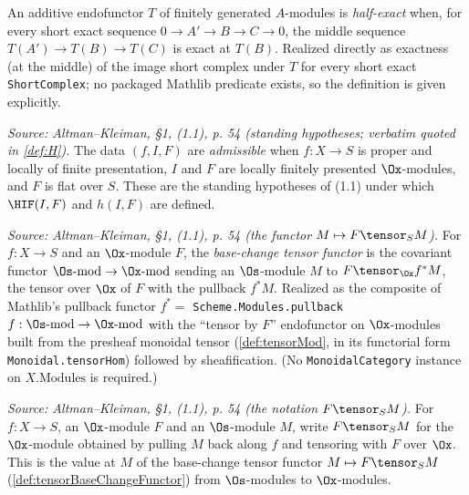 \begin{definition}
  \label{def:isHalfExact}
  An additive endofunctor $T$ of finitely generated $A$-modules is
  \emph{half-exact} when, for every short exact sequence
  $0 \to A' \to B \to C \to 0$, the middle sequence $T(A') \to T(B) \to T(C)$ is
  exact at $T(B)$. Realized directly as exactness (at the middle) of the image
  short complex under $T$ for every short exact \texttt{ShortComplex}; no packaged
  Mathlib predicate exists, so the definition is given explicitly.
\end{definition}

\begin{definition}
  \label{def:admissible}
  \textit{Source: Altman--Kleiman, §1, (1.1), p. 54 (standing hypotheses; verbatim quoted in \cref{def:H}).}
  The data $(f, I, F)$ are \emph{admissible} when $f : X \to S$ is proper and
  locally of finite presentation, $I$ and $F$ are locally finitely presented
  $\Ox$-modules, and $F$ is flat over $S$. These are the standing hypotheses of
  (1.1) under which $\HIF(I,F)$ and $h(I,F)$ are defined.
\end{definition}

\begin{definition}

  \label{def:tensorBaseChangeFunctor}
  \textit{Source: Altman--Kleiman, §1, (1.1), p. 54 (the functor $M \mapsto F \tensor_S M$).}
  For $f : X \to S$ and an $\Ox$-module $F$, the \emph{base-change tensor functor}
  is the covariant functor $\Os\text{-mod} \to \Ox\text{-mod}$ sending an
  $\Os$-module $M$ to $F \tensor_{\Ox} f^* M$, the tensor over $\Ox$ of $F$ with
  the pullback $f^* M$. Realized as the composite of Mathlib's pullback functor
  $f^* = $ \texttt{Scheme.Modules.pullback}\,$f : \Os\text{-mod} \to \Ox\text{-mod}$
  with the ``tensor by $F$'' endofunctor on $\Ox$-modules built from the presheaf
  monoidal tensor (\cref{def:tensorMod}, in its functorial form
  \texttt{Monoidal.tensorHom}) followed by sheafification. (No
  \texttt{MonoidalCategory} instance on $X.\mathrm{Modules}$ is required.)
\end{definition}

\begin{definition}
  \label{def:tensorBC}
  \textit{Source: Altman--Kleiman, §1, (1.1), p. 54 (the notation $F \tensor_S M$).}
  For $f : X \to S$, an $\Ox$-module $F$ and an $\Os$-module $M$, write
  $F \tensor_S M$ for the $\Ox$-module obtained by pulling $M$ back along $f$ and
  tensoring with $F$ over $\Ox$. This is the value at $M$ of the base-change
  tensor functor $M \mapsto F \tensor_S M$ (\cref{def:tensorBaseChangeFunctor})
  from $\Os$-modules to $\Ox$-modules.
\end{definition}

